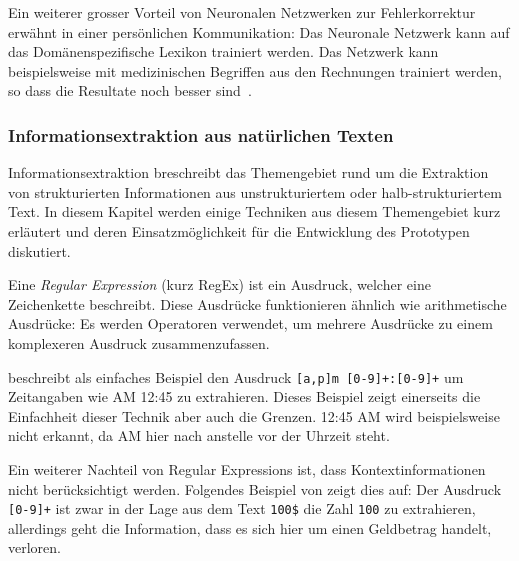 \documentclass{hwz}
\begin{document}

Ein weiterer grosser Vorteil von Neuronalen Netzwerken zur Fehlerkorrektur erwähnt \textcite{Mugan2018PersonlicheE-Mail} in einer persönlichen Kommunikation: Das Neuronale Netzwerk kann auf das Domänenspezifische Lexikon trainiert werden. Das Netzwerk kann beispielsweise mit medizinischen Begriffen aus den Rechnungen trainiert werden, so dass die Resultate noch besser sind~\autocite{Mugan2018PersonlicheE-Mail}.

\subsubsection{Informationsextraktion aus natürlichen Texten}


Informationsextraktion breschreibt das Themengebiet rund um die Extraktion von strukturierten Informationen aus unstrukturiertem oder halb-strukturiertem Text. In diesem Kapitel werden einige Techniken aus diesem Themengebiet kurz erläutert und deren Ein\-satz\-mög\-lich\-keit für die Entwicklung des Prototypen diskutiert.

Eine \textit{Regular Expression} (kurz RegEx) ist ein Ausdruck, welcher eine Zeichenkette beschreibt. Diese Ausdrücke funktionieren ähnlich wie arithmetische Ausdrücke: Es werden Operatoren verwendet, um mehrere Ausdrücke zu einem komplexeren Ausdruck zusammenzufassen\autocite{Xiao2004InformationApplications}.

\textcite{Xiao2004InformationApplications} beschreibt als einfaches Beispiel den Ausdruck \texttt{[a,p]m [0-9]+:[0-9]+} um Zeitangaben wie AM 12:45 zu extrahieren. Dieses Beispiel zeigt einerseits die Einfachheit dieser Technik aber auch die Grenzen. 12:45 AM wird beispielsweise nicht erkannt, da AM hier nach anstelle vor der Uhrzeit steht. 

Ein weiterer Nachteil von Regular Expressions ist, dass Kontextinformationen nicht be\-rück\-sich\-tigt werden. Folgendes Beispiel von \textcite{Xiao2004InformationApplications} zeigt dies auf: Der Ausdruck \texttt{[0-9]+} ist zwar in der Lage aus dem Text \texttt{100\$} die Zahl \texttt{100} zu extrahieren, allerdings geht die Information, dass es sich hier um einen Geldbetrag handelt, verloren.
\end{document}
